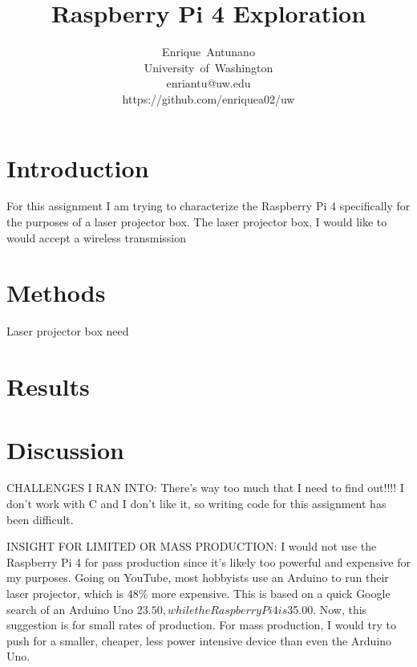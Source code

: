 \documentclass[journal]{IEEEtran}
\begin{document}
    \title{Raspberry Pi 4 Exploration}

    \author{Enrique~Antunano\\University~of~Washington\\enriantu@uw.edu\\https://github.com/enriquea02/uw}


    \maketitle

    \begin{abstract}
    
    \end{abstract}
    \section{Introduction}

    For this assignment I am trying to characterize the Raspberry Pi 4 specifically for the purposes of a laser projector box. The laser projector box, I would like to would accept a wireless transmission
    \section{Methods}

    Laser projector box need
    \section{Results}
    \section{Discussion}
    CHALLENGES I RAN INTO: There's way too much that I need to find out!!!! I don't work with C and I don't like it, so writing code for this assignment has been difficult.

    INSIGHT FOR LIMITED OR MASS PRODUCTION: \newline
    I would not use the Raspberry Pi 4 for pass production since it's likely too powerful and expensive for my purposes. 
    Going on YouTube, most hobbyists use an Arduino to run their laser projector, which is 48\% more expensive. 
    This is based on a quick Google search of an Arduino Uno $23.50, while the Raspberry Pi 4 is $35.00. 
    Now, this suggestion is for small rates of production. For mass production, I would try to push for a smaller, cheaper, less power intensive device than even the Arduino Uno.
\end{document}
